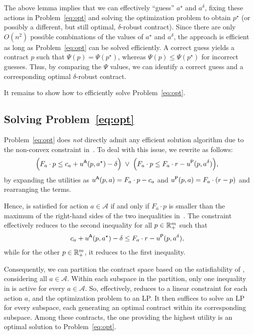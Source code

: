 The above lemma implies that we can effectively ``guess'' $a^\star$ and $a^\delta$, fixing these actions in Problem~\eqref{eq:opt} and solving the optimization problem to obtain $p^\star$ (or possibly a different, but still optimal, $\delta$-robust contract).
Since there are only $O(n^2)$ possible combinations of the values of $a^\star$ and $a^\delta$, the approach is efficient as long as Problem~\eqref{eq:opt} can be solved efficiently.
A correct guess yields a contract $p$ such that $\Psi(p) = \Psi(p^\star)$, whereas $\Psi(p) \le \Psi(p^\star)$ for incorrect guesses.
%
Thus, by comparing the $\Psi$ values, we can identify a correct guess and a corresponding optimal $\delta$-robust contract.

It remains to show how to efficiently solve Problem~\eqref{eq:opt}.

\subsection{Solving Problem~\eqref{eq:opt}}

Problem~\eqref{eq:opt} does \emph{not} directly admit any efficient solution algorithm due to the non-convex constraint in~.
To deal with this issue, we rewrite  as follows:
\begin{align}
	\Big( F_a \cdot p \le c_a + u^{\mathsf{A}}(p, a^\star) - \delta \Big) \;\vee  \;  \Big( F_a \cdot p \le F_a \cdot r - u^{\mathsf{P}}(p, a^\delta) \Big),
	\label{eq:opt-1-re}
\end{align}
by expanding the utilities as $u^{\mathsf{A}}(p, a) = F_a \cdot p - c_a$ and $u^{\mathsf{P}}(p, a) = F_a \cdot (r - p)$ and rearranging the terms.

Hence,  is satisfied for action $a \in \mathcal{A}$ if and only if $F_a \cdot p$ is smaller than the maximum of the right-hand sides of the two inequalities in~.
The constraint effectively reduces to the second inequality for all $p \in \mathbb{R}^{m}_{+}$ such that 
\begin{align}
	\label{eq:right-sides}
	c_a + u^{\mathsf{A}}(p, a^\star) - \delta \le F_a \cdot r - u^{\mathsf{P}}(p, a^\delta),
\end{align} 
while for the other $p\in \mathbb{R}^{m}_{+}$, it reduces to the first inequality.

Consequently, we can partition the contract space based on the satisfiability of , considering all $a \in \mathcal{A}$.
Within each subspace in the partition, only one inequality in  is active for every $a \in \mathcal{A}$. So, effectively,  reduces to a linear constraint for each action $a$, and the optimization problem to an LP.
%
It then suffices to solve an LP for every subspace, each generating an optimal contract within its corresponding subspace.
%
Among these contracts, the one providing the highest utility is an optimal solution to Problem~\eqref{eq:opt}.



